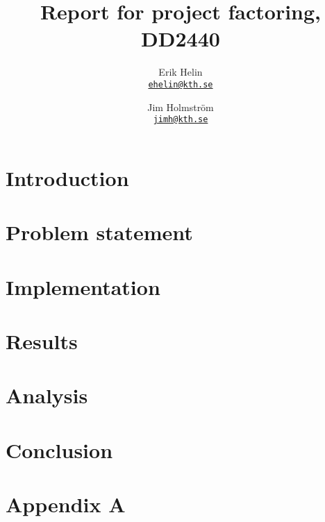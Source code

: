 \documentclass[11pt,oneside]{article}
\newcommand{\email}[1]{\href{mailto:#1}{\texttt{#1}}}
\begin{document}
\title{Report for project factoring, DD2440}
\author{Erik Helin \\ \email{ehelin@kth.se} \and Jim Holmstr\"{o}m \\ \email{jimh@kth.se}}
\maketitle

\begin{abstract}
    
\end{abstract}

\newpage

\tableofcontents

\newpage

\section{Introduction}
\label{sec:introduction}


\section{Problem statement}
\label{sec:problem_statement}


\section{Implementation}
\label{sec:implementation}


\section{Results}
\label{sec:results}


\section{Analysis}
\label{sec:analysis}


\section{Conclusion}
\label{sec:conclusion}


\begin{thebibliography}{9}
    
\end{thebibliography}

\newpage

\appendix
\section{Appendix A}

\end{document}
